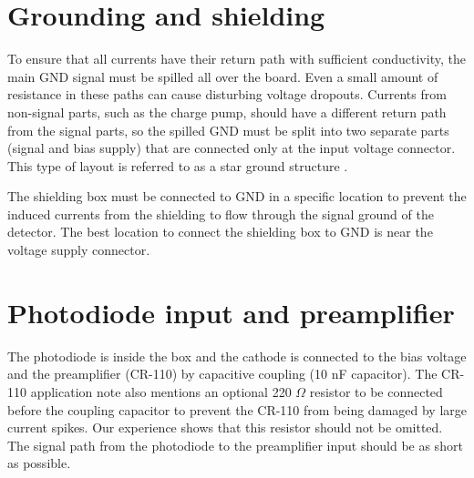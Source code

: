 \section{Grounding and shielding}
To ensure that all currents have their return path with sufficient conductivity, the main GND signal must be spilled all over the board. Even a small amount of resistance in these paths can cause disturbing voltage dropouts. Currents from non-signal parts, such as the charge pump, should have a different return path from the signal parts, so the spilled GND must be split into two separate parts (signal and bias supply) that are connected only at the input voltage connector. This type of layout is referred to as a star ground structure \cite{star}.
\par
The shielding box must be connected to GND in a specific location to prevent the induced currents from the shielding to flow through the signal ground of the detector. The best location to connect the shielding box to GND is near the voltage supply connector.


\section{Photodiode input and preamplifier}
The photodiode is inside the box and the cathode is connected to the bias voltage and the preamplifier (CR-110) by capacitive coupling (10 nF capacitor). The CR-110 application note also mentions an optional 220 $\Omega$ resistor to be connected before the coupling capacitor to prevent the CR-110 from being damaged by large current spikes. Our experience shows that this resistor should not be omitted. The signal path from the photodiode to the preamplifier input should be as short as possible. 

